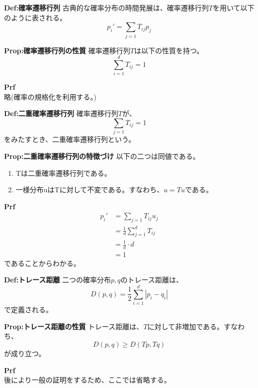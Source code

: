 \documentclass[a4paper,11pt]{jsarticle}
\numberwithin{equation}{section}
\begin{document}
\begin{itembox}[l]{\textbf{Def:確率遷移行列}}
    古典的な確率分布の時間発展は、確率遷移行列$T$を用いて以下のように表される。
    \begin{equation}
        p_i ' = \sum_{j=1} T_{ij}p_j 
    \end{equation}
\end{itembox}

\begin{itembox}[l]{\textbf{Prop:確率遷移行列の性質}}
    確率遷移行列$T$は以下の性質を持つ。
    \begin{equation}
        \sum_{i=1}^{d}T_{ij} = 1
    \end{equation}
\end{itembox}
\textbf{Prf}\\
略(確率の規格化を利用する。)\hfill \qedsymbol\\

\begin{itembox}[l]{\textbf{Def:二重確率遷移行列}}
    確率遷移行列$T$が、
    \begin{equation}
        \sum_{j=1} T_{ij} = 1
    \end{equation}
    をみたすとき、二重確率遷移行列という。
\end{itembox}
\begin{itembox}[l]{\textbf{Prop:二重確率遷移行列の特徴づけ}}
    以下の二つは同値である。
    \begin{enumerate}
        \item Tは二重確率遷移行列である。
        \item 一様分布uはTに対して不変である。すなわち、$u=Tu$である。
    \end{enumerate}
\end{itembox}
\textbf{Prf}\\
\begin{align}
    p_i ' &= \sum_{j=1} T_{ij}u_j\\
    &= \frac{1}{d}\sum_{j=1}^{d}T_{ij}\\
    &= \frac{1}{d}\cdot d\\
    &= 1
\end{align}
であることからわかる。\\

\begin{itembox}[l]{\textbf{Def:トレース距離}}
    二つの確率分布$p, q$のトレース距離は、
    \begin{equation}
        D(p, q) = \frac{1}{2}\sum_{i=1}^{d}|p_i - q_i|
    \end{equation}
    で定義される。
\end{itembox}
\begin{itembox}[l]{\textbf{Prop:トレース距離の性質}}
    トレース距離は、$T$に対して非増加である。すなわち、
    \begin{equation}
        D(p,q) \geq D(Tp, Tq)
    \end{equation}
    が成り立つ。
\end{itembox}
\textbf{Prf}\\
後により一般の証明をするため、ここでは省略する。\\
\end{document}

